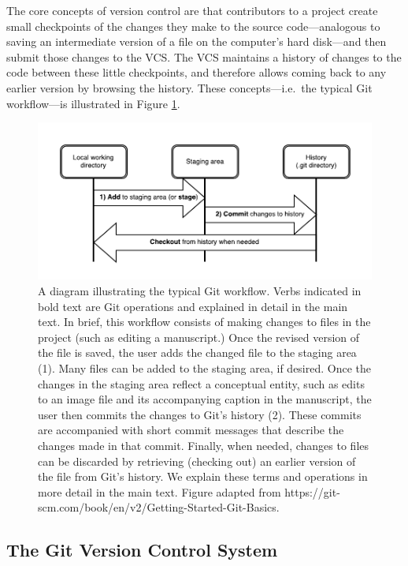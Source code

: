 \documentclass[
  american,
  ,doc,floatsintext]{apa6}
\begin{document}
The core concepts of version control are that contributors to a project create small checkpoints of the changes they make to the source code---analogous to saving an intermediate version of a file on the computer's hard disk---and then submit those changes to the VCS. The VCS maintains a history of changes to the code between these little checkpoints, and therefore allows coming back to any earlier version by browsing the history. These concepts---i.e.~the typical Git workflow---is illustrated in Figure \ref{fig:git-diagram}.

\begin{figure}

{\centering \includegraphics{../data/git-diagram} 

}

\caption{A diagram illustrating the typical Git workflow. Verbs indicated in bold text are Git operations and explained in detail in the main text. In brief, this workflow consists of making changes to files in the project (such as editing a manuscript.) Once the revised version of the file is saved, the user adds the changed file to the staging area (1). Many files can be added to the staging area, if desired. Once the changes in the staging area reflect a conceptual entity, such as edits to an image file and its accompanying caption in the manuscript, the user then commits the changes to Git's history (2). These commits are accompanied with short commit messages that describe the changes made in that commit. Finally, when needed, changes to files can be discarded by retrieving (checking out) an earlier version of the file from Git's history. We explain these terms and operations in more detail in the main text. Figure adapted from https://git-scm.com/book/en/v2/Getting-Started-Git-Basics.}\label{fig:git-diagram}
\end{figure}

\hypertarget{the-git-version-control-system}{%
\subsection{The Git Version Control System}\label{the-git-version-control-system}}
\end{document}
